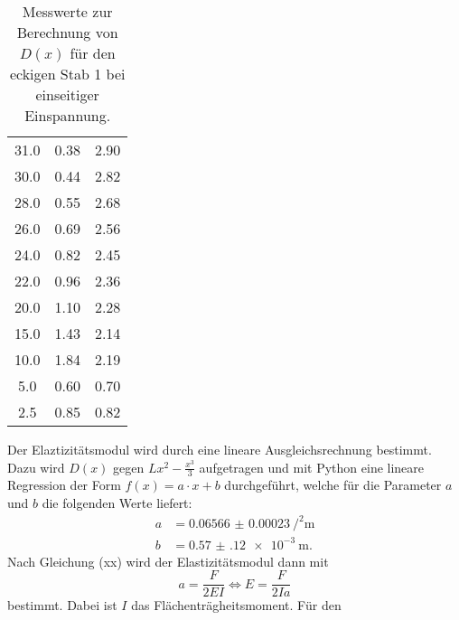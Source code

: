 \begin{table}
\begin{tabular}{c c c}
    31.0	&	0.38	&	2.90 \\
    30.0	&	0.44	&	2.82 \\
    28.0	&	0.55	&	2.68 \\
    26.0	&	0.69	&	2.56 \\
    24.0	&	0.82	&	2.45 \\
    22.0	&	0.96	&	2.36 \\
    20.0	&	1.10	&	2.28 \\
    15.0	&	1.43	&	2.14 \\
    10.0	&	1.84	&	2.19 \\
     5.0	&	0.60	&	0.70 \\
     2.5	&	0.85	&	0.82 \\
    \bottomrule
  \end{tabular}
  \caption{Messwerte zur Berechnung von $D(x)$ für den eckigen Stab 1 bei einseitiger
  Einspannung.}
  \label{tab:messung1}
\end{table}

Der Elaztizitätsmodul wird durch eine lineare Ausgleichsrechnung bestimmt. Dazu
wird $D(x)$ gegen $L x^2 - \frac{x^3}{3}$ aufgetragen und mit Python eine lineare
Regression der Form $f(x) = a \cdot x + b$ durchgeführt, welche für die Parameter
$a$ und $b$ die folgenden Werte liefert:
\begin{align*}
  a &= \SI{0.06566(23)}{\per\squared\meter} \\
  b &= \SI{0.57(12)e-3}{\meter}.
\end{align*}
Nach Gleichung (xx) wird der Elastizitätsmodul dann mit
\begin{equation}
  a = \frac{F}{2 E I} \iff E = \frac{F}{2 I a}
  \label{eqn:Emodul1}
\end{equation}
bestimmt. Dabei ist $I$ das Flächenträgheitsmoment. Für den

